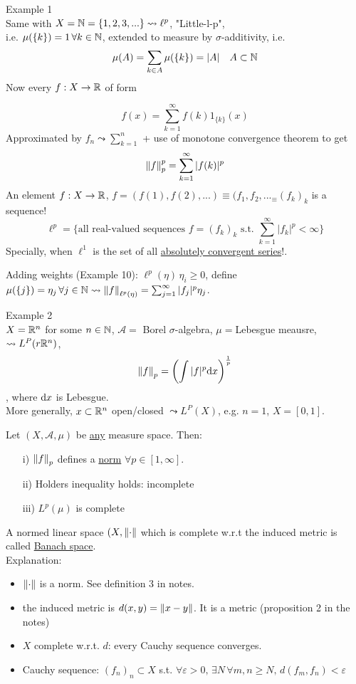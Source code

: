 \documentclass{article}
\begin{document}
Example 1\\
Same with $X=\mathbb{N}=\{1,2,3,...\}\mathrel{\leadsto} \ell^p$, "Little-l-p",\\
i.e. $\mu(\{k\})=1\,\forall k\in\mathbb{N}$, extended to measure by $\sigma$-additivity, i.e.
$$
\mu(A)=\sum_{k\in A} \mu(\{k\})=|A|\quad A\subset \mathbb{N}
$$
Now every $f:X\to \mathbb{R} $ of form 

$$f(x)=\sum_{k=1}^\infty f(k)1_{\{k\}}(x)$$
Approximated by $f_n\mathrel{\leadsto}\sum_{k=1}^n$ + use of monotone convergence theorem to get
$$\left\|{f}\right\|_p^p=\sum_{k=1}^\infty |f(k)|^p$$
An element $f:X\to \mathbb{R}$, $f=(f(1),f(2),...)\equiv(f_1,f_2,..._\equiv(f_k)_k$ is a sequence!
$$\ell^p=
\{
\text{all real-valued sequences } 
f=(f_k)_k 
\text{ s.t. } 
\sum_{k=1}^\infty|f_k|^p<\infty
\}$$
Specially, when $\ell^1$ is the set of all \underline{absolutely convergent series}!.
\begin{remark}
    Adding weights (Example 10): $\ell^p(\eta)\,\eta_i\geq0$, define $\mu(\{j\})=\eta_j\,\forall j\in\mathbb{N}\mathrel{\leadsto}\left\|{f}\right\|_{\ell^p(\eta)}=\sum_{j=1}^\infty|f_j|^p\eta_j$.
\end{remark}

Example 2\\
$X=\mathbb{R}^n$ for some $n\in\mathbb{N}$, $\mathcal{A}=$ Borel $\sigma$-algebra, $\mu=$Lebesgue meausre, $\mathrel{\leadsto}L^P(r\mathbb{R}^n)$,
$$\left\|{f}\right\|_p=\left(\int|f|^p{\rm d}x\right)^\frac{1}{p}$$, 
where ${\rm{d}}x$ is Lebesgue. \\
More generally, $x\subset \mathbb{R}^n$ open/closed $\mathrel{\leadsto} L^P(X)$, e.g. $n=1$, $X=[0,1]$.



\begin{theorem}
Let $(X,\mathcal{A},\mu)$ be {\underline {any}} measure space. Then:
\begin{itemize}
    \item [i)] $\left\|{f}\right\|_p$ defines a \underline{norm} $\forall p\in[1,\infty]$.
    \item [ii)] Holders inequality holds:{\color{red} incomplete}
    \item [iii)] $L^p(\mu)$ is complete
\end{itemize}
\end{theorem}

\begin{definition}
A normed linear space $(X,\left\|{\cdot}\right\|$ which is complete w.r.t the induced metric is called \underline{Banach space}.\\
Explanation:
\begin{itemize}
    \item $\left\|{\cdot}\right\|$ is a norm. See definition 3 in notes.
    \item the induced metric is $d(x,y)=\left\|{x-y}\right\|$. It is a metric (proposition 2 in the notes) %
    \item $X$ complete w.r.t. $d$: every Cauchy sequence converges.
    \item Cauchy sequence: $(f_n)_n\subset X$ s.t. $\forall \varepsilon>0,\,\exists N\,\forall m,n\geq N,\,d(f_m,f_n)<\varepsilon$
\end{itemize}
\end{definition}
\end{document}
